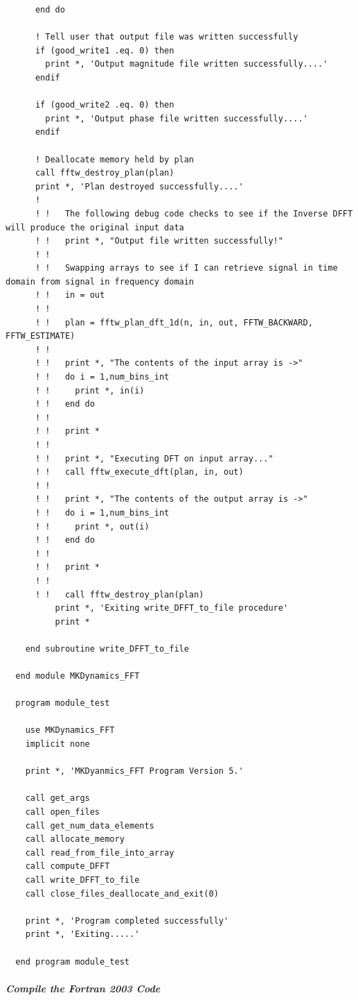 \begin{verbatim}
      end do
  
      ! Tell user that output file was written successfully
      if (good_write1 .eq. 0) then
        print *, 'Output magnitude file written successfully....'
      endif
      
      if (good_write2 .eq. 0) then
        print *, 'Output phase file written successfully....'
      endif
      
      ! Deallocate memory held by plan
      call fftw_destroy_plan(plan)
      print *, 'Plan destroyed successfully....'
      ! 
      ! !   The following debug code checks to see if the Inverse DFFT will produce the original input data  
      ! !   print *, "Output file written successfully!"
      ! !     
      ! !   Swapping arrays to see if I can retrieve signal in time domain from signal in frequency domain
      ! !   in = out
      ! !     
      ! !   plan = fftw_plan_dft_1d(n, in, out, FFTW_BACKWARD, FFTW_ESTIMATE)
      ! !     
      ! !   print *, "The contents of the input array is ->"
      ! !   do i = 1,num_bins_int
      ! !     print *, in(i)
      ! !   end do
      ! !     
      ! !   print *
      ! !     
      ! !   print *, "Executing DFT on input array..."
      ! !   call fftw_execute_dft(plan, in, out)
      ! !     
      ! !   print *, "The contents of the output array is ->"
      ! !   do i = 1,num_bins_int
      ! !     print *, out(i)
      ! !   end do
      ! !     
      ! !   print *
      ! !     
      ! !   call fftw_destroy_plan(plan)
          print *, 'Exiting write_DFFT_to_file procedure'
          print *
  
    end subroutine write_DFFT_to_file
  
  end module MKDynamics_FFT
  
  program module_test
    
    use MKDynamics_FFT
    implicit none
    
    print *, 'MKDyanmics_FFT Program Version 5.'
  
    call get_args
    call open_files
    call get_num_data_elements
    call allocate_memory
    call read_from_file_into_array
    call compute_DFFT
    call write_DFFT_to_file
    call close_files_deallocate_and_exit(0)
    
    print *, 'Program completed successfully'
    print *, 'Exiting.....'  
  
  end program module_test
\end{verbatim}

\subparagraph{Compile the Fortran 2003 Code}

